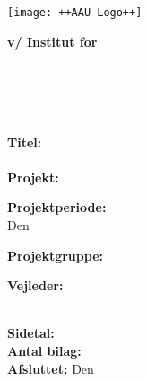 

\cleardoublepage
{}
{}
\thispagestyle{empty}

\begin{minipage}[t]{0.48\textwidth}
\vspace*{-25pt}
\texttt{[image: ++AAU-Logo++]}
\end{minipage}
\hfill
\begin{minipage}[t]{0.48\textwidth}
{\small 
\textbf{v/ Institut for\\
\institutionname}\\
\studyname\\
\adress\\
\city\\
}
\end{minipage}
%
\vspace*{1cm}
%
\begin{minipage}[t]{0.48\textwidth}
\textbf{Titel:} \\[5pt]\bigskip\hspace{2ex}
\projectname\hspace{2ex}
\projectnameextension\\


%
\textbf{Projekt:} \\[5pt]\bigskip\hspace{2ex}
\semestername

\textbf{Projektperiode:} \\[5pt]\bigskip\hspace{2ex}
Den \projectperiod

\textbf{Projektgruppe:} \\[5pt]\bigskip\hspace{2ex}
\groupname


\textbf{Vejleder:} \\[5pt]\hspace*{2ex}
\supervisor \\\hspace*{2ex}

\textbf{Sidetal:} \numberofpages \\ %
\textbf{Antal bilag:} \numberofappendix \\ %
\textbf{Afsluttet:} Den \finishdate\ \finishyear
\end{minipage}
